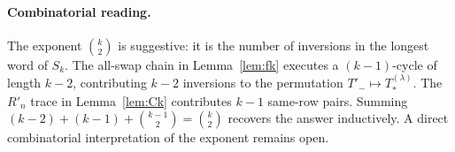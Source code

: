 \documentclass[11pt]{article}
\theoremstyle{definition}
\begin{document}
\paragraph{Combinatorial reading.}  The exponent $\binom{k}{2}$ is
suggestive: it is the number of inversions in the longest word of
$S_k$.  The all-swap chain in Lemma~\ref{lem:fk} executes a
$(k-1)$-cycle of length $k - 2$, contributing $k - 2$ inversions to
the permutation $T'_- \mapsto T_{*}^{(\lambda)}$.  The $R'_n$ trace in
Lemma~\ref{lem:Ck} contributes $k - 1$ same-row pairs.  Summing
$(k-2) + (k-1) + \binom{k-1}{2} = \binom{k}{2}$ recovers the answer
inductively.  A direct combinatorial interpretation of the exponent
remains open.
\end{document}
